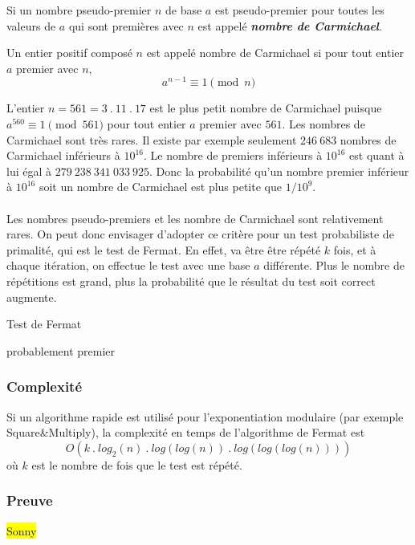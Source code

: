\begin{itemize}
				Si un nombre pseudo-premier $n$ de base $a$ est pseudo-premier pour toutes les valeurs de $a$ qui sont premières avec $n$ est appelé \textit{\textbf{nombre de Carmichael}}. 
			
					\vspace{-1.5em}\begin{adjustwidth}{1.5cm}{1.5cm} 
					\begin{Def}
						\label{Carmich}
						Un entier positif composé $n$ est appelé nombre de Carmichael si pour tout entier $a$ premier avec $n$,
						\[a^{n-1}\equiv 1 \pmod n\]
					\end{Def}
					\end{adjustwidth}\vspace{0.5em}
					
				L'entier $n = 561 = 3\ .\ 11\ .\ 17$ est le plus petit nombre de Carmichael puisque $a^{560} \equiv 1 \pmod 561$ pour tout entier $a$ premier avec $561$. Les nombres de Carmichael sont très rares. Il existe par exemple seulement $246\ 683$ nombres de Carmichael inférieurs à $10^{16}$. Le nombre de premiers inférieurs à $10^{16}$ est quant à lui égal à $279\ 238\ 341\ 033\ 925$. Donc la probabilité qu'un nombre premier inférieur à $10^{16}$ soit un nombre de Carmichael est plus petite que $1/10^{9}$.
			
		\end{itemize}
		
		\paragraph{}Les nombres pseudo-premiers et les nombre de Carmichael sont relativement rares. On peut donc envisager d'adopter ce critère pour un test probabiliste de primalité, qui est le test de Fermat. En effet, va être être répété $k$ fois, et à chaque itération, on effectue le test avec une base $a$ différente. Plus le nombre de répétitions est grand, plus la probabilité que le résultat du test soit correct augmente.\\
		
		\begin{algorithm}[H]
			\caption{Test de Fermat}\label{TF}
		\Retour probablement premier\;
		\end{algorithm}
		
		
	\subsubsection{Complexité}
		Si un algorithme rapide est utilisé pour l'exponentiation modulaire (par exemple Square\&Multiply), la complexité en temps de l'algorithme de Fermat est
		\[O(k\ .\ log_{2}(n)\ .\ log(log(n))\ .\ log(log(log(n))))\]
		où $k$ est le nombre de fois que le test est répété.
	
	
	\subsubsection{Preuve}
		\colorbox{yellow}{Sonny}